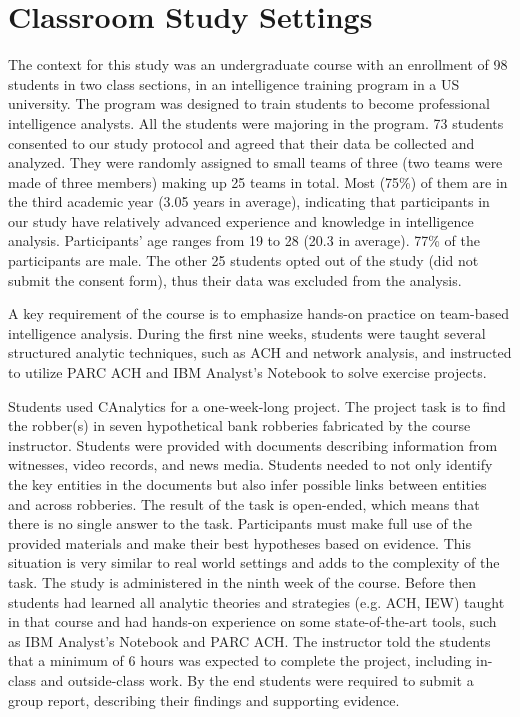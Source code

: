\section{Classroom Study Settings}

The context for this study was an undergraduate course with an enrollment of 98 students in two class sections, in an intelligence training program in a US university. The program was designed to train students to become professional intelligence analysts. All the students were majoring in the program. 73 students consented to our study protocol and agreed that their data be collected and analyzed. They were randomly assigned to small teams of three (two teams were made of three members) making up 25 teams in total. Most (75\%) of them are in the third academic year (3.05 years in average), indicating that participants in our study have relatively advanced experience and knowledge in intelligence analysis. Participants' age ranges from 19 to 28 (20.3 in average). 77\% of the participants are male. The other 25 students opted out of the study (did not submit the consent form), thus their data was excluded from the analysis.

A key requirement of the course is to emphasize hands-on practice on team-based intelligence analysis. During the first nine weeks, students were taught several structured analytic techniques, such as ACH and network analysis, and instructed to utilize PARC ACH and IBM Analyst's Notebook to solve exercise projects.

Students used CAnalytics for a one-week-long project. The project task is to find the robber(s) in seven hypothetical bank robberies fabricated by the course instructor. Students were provided with documents describing information from witnesses, video records, and news media. Students needed to not only identify the key entities in the documents but also infer possible links between entities and across robberies. The result of the task is open-ended, which means that there is no single answer to the task. Participants must make full use of the provided materials and make their best hypotheses based on evidence. This situation is very similar to real world settings and adds to the complexity of the task. The study is administered in the ninth week of the course. Before then students had learned all analytic theories and strategies (e.g. ACH, IEW) taught in that course and had hands-on experience on some state-of-the-art tools, such as IBM Analyst's Notebook and PARC ACH. The instructor told the students that a minimum of 6 hours was expected to complete the project, including in-class and outside-class work. By the end students were required to submit a group report, describing their findings and supporting evidence.

